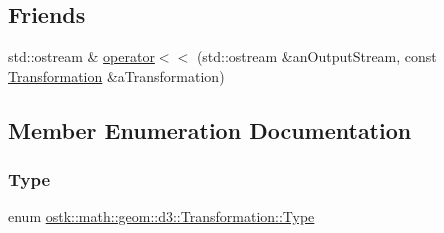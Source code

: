 \subsection*{Friends}
\begin{DoxyCompactItemize}
\item 
std\+::ostream \& \hyperlink{classostk_1_1math_1_1geom_1_1d3_1_1_transformation_afb2829e106dc4aeab1c706d1eaa357e8}{operator$<$$<$} (std\+::ostream \&an\+Output\+Stream, const \hyperlink{classostk_1_1math_1_1geom_1_1d3_1_1_transformation}{Transformation} \&a\+Transformation)
\end{DoxyCompactItemize}


\subsection{Member Enumeration Documentation}
\mbox{\label{classostk_1_1math_1_1geom_1_1d3_1_1_transformation_a04794da018108a1e973dad364c32b4ec}} 
\subsubsection{\texorpdfstring{Type}{Type}}
{\footnotesize\ttfamily enum \hyperlink{classostk_1_1math_1_1geom_1_1d3_1_1_transformation_a04794da018108a1e973dad364c32b4ec}{ostk\+::math\+::geom\+::d3\+::\+Transformation\+::\+Type}\hspace{0.3cm}{\ttfamily [strong]}}

